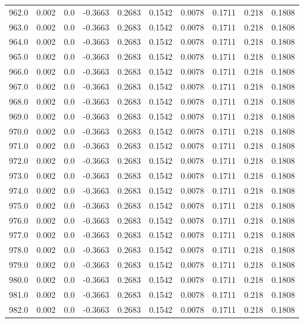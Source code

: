 \begin{longtable}{lrrrrrrrrr}
962.0 & 0.002 & 0.0 & -0.3663 & 0.2683 & 0.1542 & 0.0078 & 0.1711 & 0.218 & 0.1808 \\
963.0 & 0.002 & 0.0 & -0.3663 & 0.2683 & 0.1542 & 0.0078 & 0.1711 & 0.218 & 0.1808 \\
964.0 & 0.002 & 0.0 & -0.3663 & 0.2683 & 0.1542 & 0.0078 & 0.1711 & 0.218 & 0.1808 \\
965.0 & 0.002 & 0.0 & -0.3663 & 0.2683 & 0.1542 & 0.0078 & 0.1711 & 0.218 & 0.1808 \\
966.0 & 0.002 & 0.0 & -0.3663 & 0.2683 & 0.1542 & 0.0078 & 0.1711 & 0.218 & 0.1808 \\
967.0 & 0.002 & 0.0 & -0.3663 & 0.2683 & 0.1542 & 0.0078 & 0.1711 & 0.218 & 0.1808 \\
968.0 & 0.002 & 0.0 & -0.3663 & 0.2683 & 0.1542 & 0.0078 & 0.1711 & 0.218 & 0.1808 \\
969.0 & 0.002 & 0.0 & -0.3663 & 0.2683 & 0.1542 & 0.0078 & 0.1711 & 0.218 & 0.1808 \\
970.0 & 0.002 & 0.0 & -0.3663 & 0.2683 & 0.1542 & 0.0078 & 0.1711 & 0.218 & 0.1808 \\
971.0 & 0.002 & 0.0 & -0.3663 & 0.2683 & 0.1542 & 0.0078 & 0.1711 & 0.218 & 0.1808 \\
972.0 & 0.002 & 0.0 & -0.3663 & 0.2683 & 0.1542 & 0.0078 & 0.1711 & 0.218 & 0.1808 \\
973.0 & 0.002 & 0.0 & -0.3663 & 0.2683 & 0.1542 & 0.0078 & 0.1711 & 0.218 & 0.1808 \\
974.0 & 0.002 & 0.0 & -0.3663 & 0.2683 & 0.1542 & 0.0078 & 0.1711 & 0.218 & 0.1808 \\
975.0 & 0.002 & 0.0 & -0.3663 & 0.2683 & 0.1542 & 0.0078 & 0.1711 & 0.218 & 0.1808 \\
976.0 & 0.002 & 0.0 & -0.3663 & 0.2683 & 0.1542 & 0.0078 & 0.1711 & 0.218 & 0.1808 \\
977.0 & 0.002 & 0.0 & -0.3663 & 0.2683 & 0.1542 & 0.0078 & 0.1711 & 0.218 & 0.1808 \\
978.0 & 0.002 & 0.0 & -0.3663 & 0.2683 & 0.1542 & 0.0078 & 0.1711 & 0.218 & 0.1808 \\
979.0 & 0.002 & 0.0 & -0.3663 & 0.2683 & 0.1542 & 0.0078 & 0.1711 & 0.218 & 0.1808 \\
980.0 & 0.002 & 0.0 & -0.3663 & 0.2683 & 0.1542 & 0.0078 & 0.1711 & 0.218 & 0.1808 \\
981.0 & 0.002 & 0.0 & -0.3663 & 0.2683 & 0.1542 & 0.0078 & 0.1711 & 0.218 & 0.1808 \\
982.0 & 0.002 & 0.0 & -0.3663 & 0.2683 & 0.1542 & 0.0078 & 0.1711 & 0.218 & 0.1808 \\

\end{longtable}
